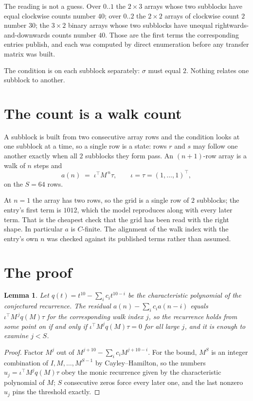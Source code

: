 \documentclass[11pt,a4paper]{article}
\theoremstyle{plain}
\newtheorem{lemma}[theorem]{Lemma}
\theoremstyle{definition}
\begin{document}
The reading is not a guess. Over $0..1$ the $2\times3$ arrays whose two subblocks have equal
clockwise counts number $40$; over $0..2$ the $2\times2$ arrays of clockwise count $2$ number
$30$; the $3\times2$ binary arrays whose two subblocks have unequal rightwards-and-downwards
counts number $40$. Those are the first terms the corresponding entries publish, and each was
computed by direct enumeration before any transfer matrix was built.

The condition is on each subblock separately: $\sigma$ must equal $2$. Nothing
relates one subblock to another.

\section{The count is a walk count}

A subblock is built from two consecutive array rows and the condition looks
at one subblock at a time, so a single row is a state: rows $r$ and $s$ may follow one another
exactly when all $2$ subblocks they form pass. An $(n+1)$-row array is a walk of $n$ steps and
\[
a(n)\;=\;\iota^{\!\top}M^{\,n}\tau,\qquad\iota=\tau=(1,\dots,1)^{\!\top},
\]
on the $S=64$ rows.

At $n=1$ the array has two rows, so the grid is a single row of $2$
subblocks; the entry's first term is $1012$, which the model
reproduces along with every later term. That is the cheapest check that the grid has been read
with the right shape.
In particular $a$ is $C$-finite. The alignment of the walk index with the entry's own $n$ was
checked against its published terms rather than assumed.

\section{The proof}

\begin{lemma}\label{lem:crit}
Let $q(t)=t^{10}-\sum_i c_it^{10-i}$ be the characteristic polynomial of the
conjectured recurrence. The residual $a(n)-\sum_ic_ia(n-i)$ equals
$\iota^{\!\top}M^{\,j}q(M)\tau$ for the corresponding walk index $j$, so the recurrence
holds from some point on if and only if $\iota^{\!\top}M^{j}q(M)\tau=0$ for all large $j$,
and it is enough to examine $j<S$.
\end{lemma}

\begin{proof}
Factor $M^{j}$ out of $M^{j+10}-\sum_ic_iM^{j+10-i}$. For the bound, $M^{S}$
is an integer combination of $I,M,\dots,M^{S-1}$ by Cayley--Hamilton, so the numbers
$u_j=\iota^{\!\top}M^{j}q(M)\tau$ obey the monic recurrence given by the characteristic
polynomial of $M$; $S$ consecutive zeros force every later one, and the last nonzero $u_j$
pins the threshold exactly.
\end{proof}
\end{document}
